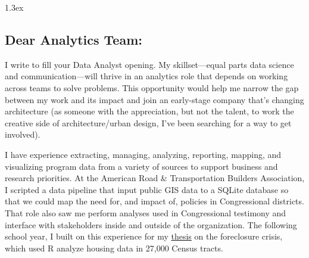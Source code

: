 \documentclass{stationery-letter}
\begin{document}
%
%



%
%

\begin{minipage}[t]{0.70\textwidth}
    \begin{onehalfspace}
        \parskip 1.3ex
        \sectionsep
        \subsection{Dear Analytics Team:}
        \sectionsep
        I write to fill your Data Analyst opening.
        My skillset---equal parts data science and communication---will thrive in an analytics role that depends on working across teams to solve problems.
        This opportunity would help me narrow the gap between my work and its impact and join an early-stage company that's changing architecture (as someone with the appreciation, but not the talent, to work the creative side of architecture/urban design, I've been searching for a way to get involved).

        I have experience extracting, managing, analyzing, reporting, mapping, and visualizing program data from a variety of sources to support business and research priorities.
        At the American Road \& Transportation Builders Association, I scripted a data pipeline that input public GIS data to a SQLite database so that we could map the need for, and impact of, policies in Congressional districts.
        That role also saw me perform analyses used in Congressional testimony and interface with stakeholders inside and outside of the organization.
        The following school year, I built on this experience for my \href{https://runkelcorey.github.io/publication/thesis/outcome.html#outcome}{thesis} on the foreclosure crisis, which used R analyze housing data in 27,000 Census tracts.


\end{onehalfspace}
\end{minipage}
\end{document}
